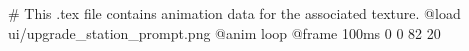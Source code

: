 # This .tex file contains animation data for the associated texture.
@load ui/upgrade_station_prompt.png
@anim loop
	@frame 100ms 0 0 82 20
